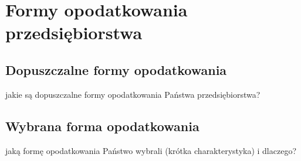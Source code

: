 \section{Formy opodatkowania przedsiębiorstwa}
\subsection{Dopuszczalne formy opodatkowania}
jakie są dopuszczalne formy opodatkowania Państwa 
przedsiębiorstwa?
\subsection{Wybrana forma opodatkowania}
jaką formę opodatkowania Państwo wybrali (krótka 
charakterystyka) i dlaczego?